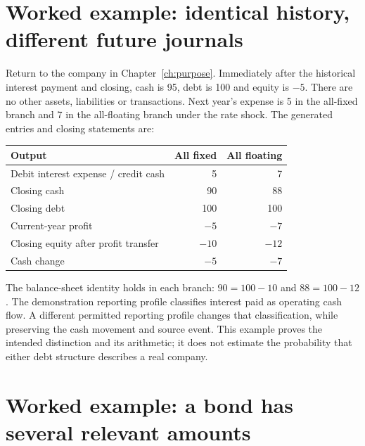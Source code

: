 \section{Worked example: identical history, different future journals}

Return to the company in Chapter~\ref{ch:purpose}. Immediately after the
historical interest payment and closing, cash is 95, debt is 100 and equity
is $-5$. There are no other assets, liabilities or transactions. Next year's
expense is 5 in the all-fixed branch and 7 in the all-floating branch under
the rate shock. The generated entries and closing statements are:

\begin{center}
\begin{tabular}{lrr}
\toprule Output & All fixed & All floating\\\midrule
Debit interest expense / credit cash &5&7\\
Closing cash &90&88\\
Closing debt &100&100\\
Current-year profit & $-5$ & $-7$\\
Closing equity after profit transfer &$-10$&$-12$\\
Cash change &$-5$&$-7$\\\bottomrule
\end{tabular}
\end{center}
The balance-sheet identity holds in each branch: $90=100-10$ and
$88=100-12$. The demonstration reporting profile classifies interest paid as
operating cash flow. A different permitted reporting profile changes that
classification, while preserving the cash movement and source event. This
example proves the intended distinction and its arithmetic; it does not
estimate the probability that either debt structure describes a real company.

\section{Worked example: a bond has several relevant amounts}

